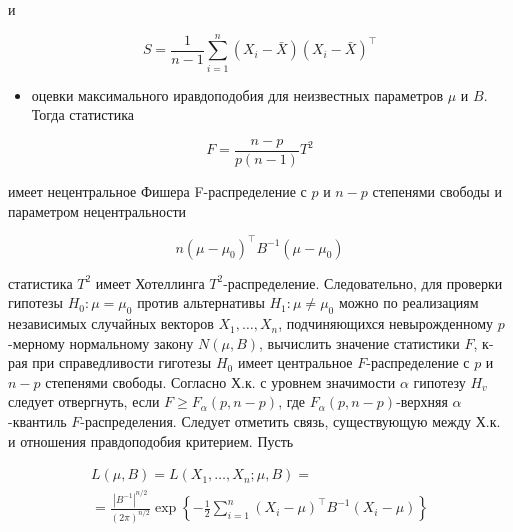 \documentclass[10pt]{article}
\begin{document}
и



\[

S=\frac{1}{n-1} \sum_{i=1}^{n}\left(X_{i}-\bar{X}\right)\left(X_{i}-\bar{X}\right)^{\top}

\]



\begin{itemize}

  \item оцевки максимального иравдоподобия для неизвестных параметров $\mu$ и $B$. Тогда статистика

\end{itemize}



\[

F=\frac{n-p}{p(n-1)} T^{2}

\]



имеет нецентральное Фишера F-распределение с $p$ и $n-p$ степенями свободы и параметром нецентральности



\[

n\left(\mu-\mu_{0}\right)^{\top} B^{-1}\left(\mu-\mu_{0}\right)

\]



статистика $T^{2}$ имеет Хотеллинга $T^{2}$-распределение. Следовательно, для проверки гипотезы $H_{0}: \mu=\mu_{0}$ против альтернативы $H_{1}: \mu \neq \mu_{0}$ можно по реализациям независимых случайных векторов $X_{1}, \ldots, X_{n}$, подчиняющихся невырожденному $p$-мерному нормальному закону $N(\mu, B)$, вычислить значение статистики $F$, к-рая при справедливости гиготезы $H_{0}$ имеет центральное $F$-распределение с $p$ и $n-p$ степенями свободы. Согласно Х.к. с уровнем значимости $\alpha$ гипотезу $H_{v}$ следует отвергнуть, если $F \geqslant F_{\alpha}(p, n-p)$, где $F_{\alpha}(p, n-p)$-верхняя $\alpha$-квантиль $F$-распределения. Следует отметить связь, существующую между Х.к. и отношения правдоподобия критерием. Пусть



\[

\begin{gathered}

L(\mu, B)=L\left(X_{1}, \ldots, X_{n} ; \mu, B\right)= \\

=\frac{\left|B^{-1}\right|^{n / 2}}{(2 \pi)^{n / 2}} \exp \left\{-\frac{1}{2} \sum_{i=1}^{n}\left(X_{i}-\mu\right)^{\top} B^{-1}\left(X_{i}-\mu\right)\right\}

\end{gathered}

\]
\end{document}
